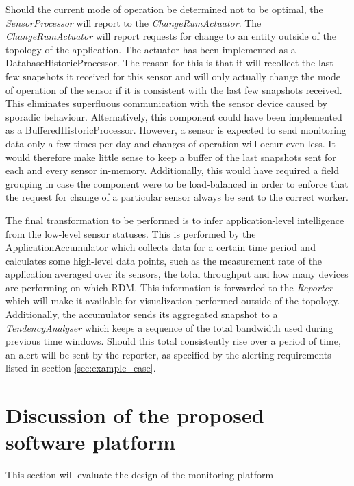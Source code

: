 Should the current mode of operation be determined not to be optimal, the \emph{SensorProcessor} will report to the \emph{ChangeRumActuator}. The \emph{ChangeRumActuator} will report requests for change to an entity outside of the topology of the application. The actuator has been implemented as a DatabaseHistoricProcessor. The reason for this is that it will recollect the last few snapshots it received for this sensor and will only actually change the mode of operation of the sensor if it is consistent with the last few snapshots received. This eliminates superfluous communication with the sensor device caused by sporadic behaviour. Alternatively, this component could have been implemented as a BufferedHistoricProcessor. However, a sensor is expected to send monitoring data only a few times per day and changes of operation will occur even less. It would therefore make little sense to keep a buffer of the last snapshots sent for each and every sensor in-memory. Additionally, this would have required a field grouping in case the component were to be load-balanced in order to enforce that the request for change of a particular sensor always be sent to the correct worker.

The final transformation to be performed is to infer application-level intelligence from the low-level sensor statuses. This is performed by the ApplicationAccumulator which collects data for a certain time period and calculates some high-level data points, such as the measurement rate of the application averaged over its sensors, the total throughput and how many devices are performing on which RDM. This information is forwarded to the \emph{Reporter} which will make it available for visualization performed outside of the topology. Additionally, the accumulator sends its aggregated snapshot to a \emph{TendencyAnalyser} which keeps a sequence of the total bandwidth used during previous time windows. Should this total consistently rise over a period of time, an alert will be sent by the reporter, as specified by the alerting requirements listed in section \ref{sec:example_case}.
	
\section{Discussion of the proposed software platform}
This section will evaluate the design of the monitoring platform

